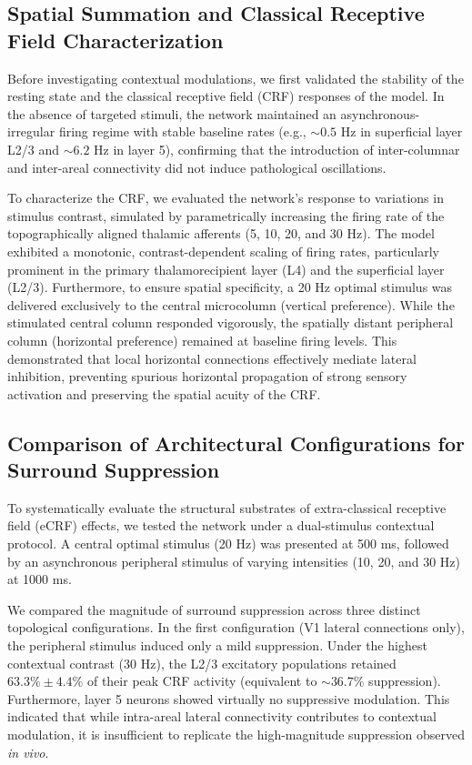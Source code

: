 \subsection{Spatial Summation and Classical Receptive Field Characterization}
Before investigating contextual modulations, we first validated the stability of the resting state and the classical receptive field (CRF) responses of the model. In the absence of targeted stimuli, the network maintained an asynchronous-irregular firing regime with stable baseline rates (e.g., $\sim 0.5$ Hz in superficial layer L2/3 and $\sim 6.2$ Hz in layer 5), confirming that the introduction of inter-columnar and inter-areal connectivity did not induce pathological oscillations. 

To characterize the CRF, we evaluated the network's response to variations in stimulus contrast, simulated by parametrically increasing the firing rate of the topographically aligned thalamic afferents (5, 10, 20, and 30 Hz). The model exhibited a monotonic, contrast-dependent scaling of firing rates, particularly prominent in the primary thalamorecipient layer (L4) and the superficial layer (L2/3). Furthermore, to ensure spatial specificity, a 20 Hz optimal stimulus was delivered exclusively to the central microcolumn (vertical preference). While the stimulated central column responded vigorously, the spatially distant peripheral column (horizontal preference) remained at baseline firing levels. This demonstrated that local horizontal connections effectively mediate lateral inhibition, preventing spurious horizontal propagation of strong sensory activation and preserving the spatial acuity of the CRF.

\subsection{Comparison of Architectural Configurations for Surround Suppression}
To systematically evaluate the structural substrates of extra-classical receptive field (eCRF) effects, we tested the network under a dual-stimulus contextual protocol. A central optimal stimulus (20 Hz) was presented at 500 ms, followed by an asynchronous peripheral stimulus of varying intensities (10, 20, and 30 Hz) at 1000 ms. 

We compared the magnitude of surround suppression across three distinct topological configurations. In the first configuration (V1 lateral connections only), the peripheral stimulus induced only a mild suppression. Under the highest contextual contrast (30 Hz), the L2/3 excitatory populations retained $63.3\% \pm 4.4\%$ of their peak CRF activity (equivalent to $\sim36.7\%$ suppression). Furthermore, layer 5 neurons showed virtually no suppressive modulation. This indicated that while intra-areal lateral connectivity contributes to contextual modulation, it is insufficient to replicate the high-magnitude suppression observed \textit{in vivo}.

